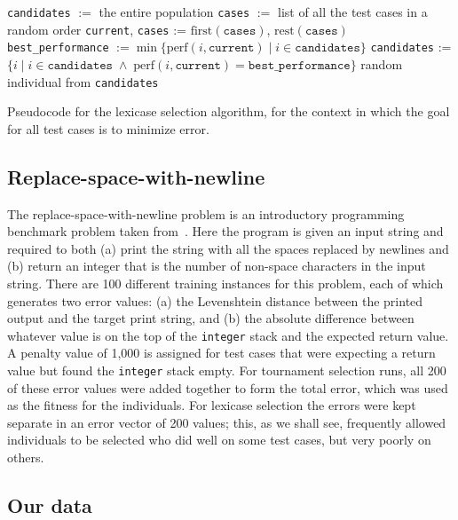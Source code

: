 \begin{algorithm}[tb]
	\begin{algorithmic}
		\STATE \texttt{candidates} $:=$ the entire population
		\STATE \texttt{cases} $:=$ list of all the test cases in a random order
		\STATE \texttt{current}, \texttt{cases} := $\textrm{first}(\texttt{cases})$, $\textrm{rest}(\texttt{cases})$
		\STATE \texttt{best\_performance} $:= \min \{ \textrm{perf}(i, \texttt{current}) \;|\; i \in \texttt{candidates} \}$
		\STATE \texttt{candidates} := $\{ i \;|\; i \in \texttt{candidates} \;\land\; \textrm{perf}(i, \texttt{current}) = \texttt{best\_performance}\}$
		\ENDWHILE
		\RETURN random individual from \texttt{candidates}
	\end{algorithmic}
	\caption{Pseudocode for the lexicase selection algorithm, for the context in which the goal for all test cases is to minimize error.}
	\label{alg:lexicase}
\end{algorithm}

\subsection{Replace-space-with-newline}

The replace-space-with-newline problem is an introductory programming benchmark problem taken
from~\citep{Helmuth:2015:GECCO}. Here the program is given an input string and required to
both (a) print the string with all the spaces replaced by newlines and (b) return an integer that
is the number of non-space characters in the input string. There are 100 different training instances 
for this problem, each of which generates two error values: (a) the Levenshtein distance between
the printed output and the target print string, and (b) the absolute difference between
whatever value is on the top of the \texttt{integer} stack and the expected return value. A penalty
value of 1,000 is assigned for test cases that were expecting a return value but found the
\texttt{integer} stack empty.
For tournament selection runs, all 200 of these error values were added together to form the
total error, which was used as the fitness for the individuals. For lexicase selection the errors
were kept separate in an error vector of 200 values; this, as we shall see, frequently allowed individuals to be selected who did 
well on some test cases, but very poorly on others.

\subsection{Our data}
\label{sec:ourData}

